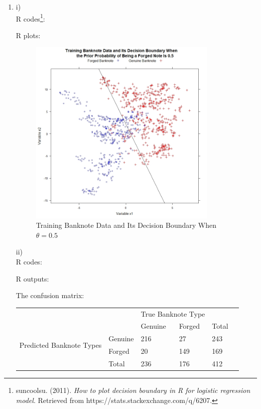 \documentclass[10pt]{article}
\begin{document}
\begin{enumerate}[1)]
\item
\subitem
i)\\
R codes\footnote{ suncoolsu. (2011). \textit{How to plot decision boundary in R for logistic regression model}. Retrieved from https://stats.stackexchange.com/q/6207.}:

\vspace{3mm}
R plots:
\begin{figure}[H]
  \centering
  \includegraphics[width=9cm,height=9cm]{p12a.jpeg}
  \caption{Training Banknote Data and Its Decision Boundary When $\theta=0.5$}
\end{figure}

\subitem
ii)\\
R codes:

\vspace{3mm}
R outputs:

\vspace{3mm}
The confusion matrix:\\
\begin{tabular}{llllll}
                                          &         & \multicolumn{2}{l}{True Banknote Type} &       &  \\
                                          &         & Genuine           & Forged             & Total &  \\
\multirow{2}{*}{Predicted Banknote Types} & Genuine & 216               & 27                 & 243   &  \\
                                          & Forged  & 20                & 149                & 169   &  \\
                                          & Total   & 236               & 176                & 412   &
\end{tabular}
\vspace{3mm}


\end{enumerate}
\end{document}
